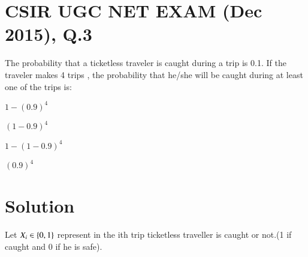 \documentclass[journal,12pt,twocolumn]{IEEEtran}
\begin{document}
\section{CSIR UGC NET EXAM (Dec 2015), Q.3}
The probability that a ticketless traveler is caught during a trip is 0.1. If the traveler makes 4 trips , the probability that he/she will be caught during at least one of the trips is:\\
\begin{inparaenum}[(A)]
    \item $1-(0.9)^4$\hspace{2.6cm}
    \item $(1-0.9)^4$\hspace{0.5cm}\\
    \item $1-(1-0.9)^4$\hspace{2cm}
    \item $(0.9)^4$
\end{inparaenum}

\section{Solution}
Let $X_i\in\left\{0,1\right\}$ represent in the ith trip ticketless traveller is caught or not.(1 if caught and 0 if he is safe).
\end{document}
